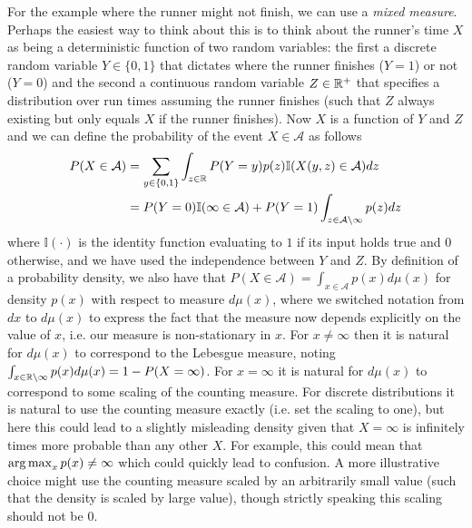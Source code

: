 For the example where the runner might not finish, we can
use a \emph{mixed measure}.  Perhaps the easiest way to think about this is to think about
the runner's time $X$ as being a deterministic function of two random variables: the first
a discrete random variable $Y\in\{0,1\}$ that dictates where the runner finishes ($Y=1$) or not ($Y=0$) and the second 
a continuous random variable $Z\in\mathbb{R}^+$ that specifies a distribution over run times assuming the
runner finishes (such that $Z$ always existing but only equals $X$ if the runner finishes).  
Now $X$ is a function of $Y$ and $Z$ and we can define the probability of the event
$X\in \mathcal{A}$ as follows
\begin{align*}
P(X \in \mathcal{A}) &= \sum_{y \in \{0,1\}} \int_{z\in \mathbb{R}} P(Y=y) p(z) \mathbb{I}(X(y,z) \in \mathcal{A}) dz \\
&= P(Y=0) \mathbb{I}(\infty\in \mathcal{A})  + P(Y=1) \int_{z\in \mathcal{A}\backslash\infty} p(z) dz
\end{align*}
where $\mathbb{I}(\cdot)$ is the identity function evaluating to $1$ if its
input holds true and $0$ otherwise, and we have used the independence between 
$Y$ and $Z$.  By definition of a probability density, we also
have that $P(X \in \mathcal{A}) = \int_{x\in\mathcal{A}} p(x) d\mu(x)$ for density $p(x)$
with respect to measure $d\mu(x)$, where we switched notation from $dx$ to $d\mu(x)$ to express
the fact that the measure now depends explicitly on the value of $x$, i.e. our measure
is non-stationary in $x$.  For $x\neq\infty$ then it is natural for $d\mu(x)$ to correspond to the
Lebesgue measure, noting $\int_{x\in \mathbb{R}\backslash\infty} p(x) d\mu(x) = 1-P(X=\infty)$.
For $x=\infty$ it is natural for $d\mu(x)$ to correspond to some scaling of the counting
measure.  For discrete distributions it is natural to use the counting measure exactly (i.e. set the
scaling to one), but here this could lead to a slightly misleading density given that $X=\infty$
is infinitely times more probable than any other $X$.  For example, this could mean that
$\operatorname*{arg\,max}_x p(x) \neq \infty$ which could quickly lead to confusion.  A more illustrative
choice might use the counting measure scaled by an arbitrarily small value (such that
the density is scaled by large value), though strictly speaking this scaling should not be $0$.

